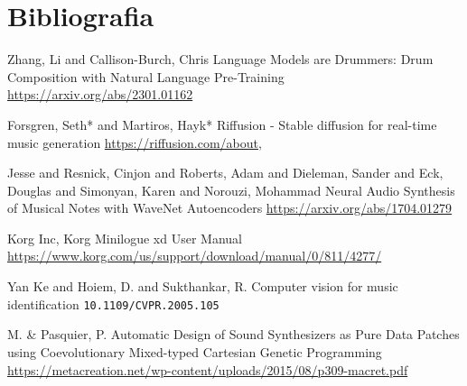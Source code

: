 \documentclass[]{beamer}
\begin{document}
\section{Bibliografia}

\begin{frame}
  \begin{thebibliography}{99} %

   Zhang, Li and Callison-Burch, Chris
  \newblock Language Models are Drummers: Drum Composition with Natural Language Pre-Training
  \newblock \url{https://arxiv.org/abs/2301.01162}

   Forsgren, Seth* and Martiros, Hayk*
  \newblock Riffusion - Stable diffusion for real-time music generation
  \newblock \url{https://riffusion.com/about},

   Jesse and Resnick, Cinjon and Roberts, Adam and Dieleman, Sander and Eck, Douglas and Simonyan, Karen and Norouzi, Mohammad
  \newblock Neural Audio Synthesis of Musical Notes with WaveNet Autoencoders
  \newblock \url{https://arxiv.org/abs/1704.01279}

  \end{thebibliography}
\end{frame}

\begin{frame}
  \begin{thebibliography}{99} %
   Korg Inc,
  \newblock Korg Minilogue xd User Manual
  \newblock \url{https://www.korg.com/us/support/download/manual/0/811/4277/}

   Yan Ke and Hoiem, D. and Sukthankar, R.
  \newblock Computer vision for music identification
  \newblock \texttt{10.1109/CVPR.2005.105}

   M. & Pasquier, P.
  \newblock Automatic Design of Sound Synthesizers as Pure Data Patches using Coevolutionary Mixed-typed Cartesian Genetic Programming
  \newblock \url{https://metacreation.net/wp-content/uploads/2015/08/p309-macret.pdf}

  \end{thebibliography}
\end{frame}
\end{document}

